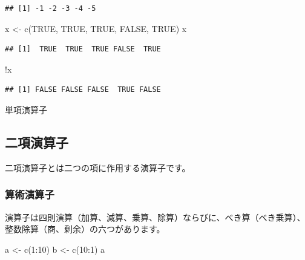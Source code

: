 \documentclass[
  12pt,
]{book}
\newenvironment{Shaded}{\begin{snugshade}}{\end{snugshade}}
\newcommand{\ConstantTok}[1]{\textcolor[rgb]{0.00,0.00,0.00}{#1}}
\newcommand{\DecValTok}[1]{\textcolor[rgb]{0.00,0.00,0.81}{#1}}
\newcommand{\FunctionTok}[1]{\textcolor[rgb]{0.00,0.00,0.00}{#1}}
\newcommand{\NormalTok}[1]{#1}
\newcommand{\OtherTok}[1]{\textcolor[rgb]{0.56,0.35,0.01}{#1}}
\newcommand{\SpecialCharTok}[1]{\textcolor[rgb]{0.00,0.00,0.00}{#1}}
\begin{document}
\begin{verbatim}
## [1] -1 -2 -3 -4 -5
\end{verbatim}

\begin{Shaded}
\begin{Highlighting}[numbers=left,,]
\NormalTok{x }\OtherTok{\textless{}{-}} \FunctionTok{c}\NormalTok{(}\ConstantTok{TRUE}\NormalTok{, }\ConstantTok{TRUE}\NormalTok{, }\ConstantTok{TRUE}\NormalTok{, }\ConstantTok{FALSE}\NormalTok{, }\ConstantTok{TRUE}\NormalTok{)}
\NormalTok{x}
\end{Highlighting}
\end{Shaded}

\begin{verbatim}
## [1]  TRUE  TRUE  TRUE FALSE  TRUE
\end{verbatim}

\begin{Shaded}
\begin{Highlighting}[numbers=left,,]
\SpecialCharTok{!}\NormalTok{x}
\end{Highlighting}
\end{Shaded}

\begin{verbatim}
## [1] FALSE FALSE FALSE  TRUE FALSE
\end{verbatim}

単項演算子

\hypertarget{ux4e8cux9805ux6f14ux7b97ux5b50}{%
\subsection{二項演算子}\label{ux4e8cux9805ux6f14ux7b97ux5b50}}

二項演算子とは二つの項に作用する演算子です。

\hypertarget{ux7b97ux8853ux6f14ux7b97ux5b50}{%
\subsubsection{算術演算子}\label{ux7b97ux8853ux6f14ux7b97ux5b50}}

演算子は四則演算（加算、減算、乗算、除算）ならびに、べき算（べき乗算）、整数除算（商、剰余）の六つがあります。

\begin{Shaded}
\begin{Highlighting}[numbers=left,,]
\NormalTok{a }\OtherTok{\textless{}{-}} \FunctionTok{c}\NormalTok{(}\DecValTok{1}\SpecialCharTok{:}\DecValTok{10}\NormalTok{)}
\NormalTok{b }\OtherTok{\textless{}{-}} \FunctionTok{c}\NormalTok{(}\DecValTok{10}\SpecialCharTok{:}\DecValTok{1}\NormalTok{)}
\NormalTok{a}
\end{Highlighting}
\end{Shaded}
\end{document}
